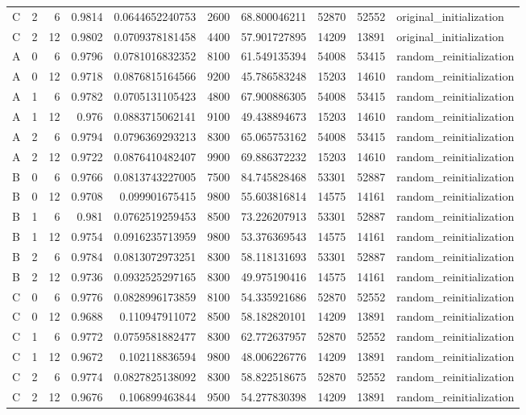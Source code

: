 \begin{tabular}{lrrrrrrrrl}
C & 2 & 6 & 0.9814 & 0.0644652240753 & 2600 & 68.800046211 & 52870 & 52552 & original\_initialization \\
C & 2 & 12 & 0.9802 & 0.0709378181458 & 4400 & 57.901727895 & 14209 & 13891 & original\_initialization \\
A & 0 & 6 & 0.9796 & 0.0781016832352 & 8100 & 61.549135394 & 54008 & 53415 & random\_reinitialization \\
A & 0 & 12 & 0.9718 & 0.0876815164566 & 9200 & 45.786583248 & 15203 & 14610 & random\_reinitialization \\
A & 1 & 6 & 0.9782 & 0.0705131105423 & 4800 & 67.900886305 & 54008 & 53415 & random\_reinitialization \\
A & 1 & 12 & 0.976 & 0.0883715062141 & 9100 & 49.438894673 & 15203 & 14610 & random\_reinitialization \\
A & 2 & 6 & 0.9794 & 0.0796369293213 & 8300 & 65.065753162 & 54008 & 53415 & random\_reinitialization \\
A & 2 & 12 & 0.9722 & 0.0876410482407 & 9900 & 69.886372232 & 15203 & 14610 & random\_reinitialization \\
B & 0 & 6 & 0.9766 & 0.0813743227005 & 7500 & 84.745828468 & 53301 & 52887 & random\_reinitialization \\
B & 0 & 12 & 0.9708 & 0.099901675415 & 9800 & 55.603816814 & 14575 & 14161 & random\_reinitialization \\
B & 1 & 6 & 0.981 & 0.0762519259453 & 8500 & 73.226207913 & 53301 & 52887 & random\_reinitialization \\
B & 1 & 12 & 0.9754 & 0.0916235713959 & 9800 & 53.376369543 & 14575 & 14161 & random\_reinitialization \\
B & 2 & 6 & 0.9784 & 0.0813072973251 & 8300 & 58.118131693 & 53301 & 52887 & random\_reinitialization \\
B & 2 & 12 & 0.9736 & 0.0932525297165 & 8300 & 49.975190416 & 14575 & 14161 & random\_reinitialization \\
C & 0 & 6 & 0.9776 & 0.0828996173859 & 8100 & 54.335921686 & 52870 & 52552 & random\_reinitialization \\
C & 0 & 12 & 0.9688 & 0.110947911072 & 8500 & 58.182820101 & 14209 & 13891 & random\_reinitialization \\
C & 1 & 6 & 0.9772 & 0.0759581882477 & 8300 & 62.772637957 & 52870 & 52552 & random\_reinitialization \\
C & 1 & 12 & 0.9672 & 0.102118836594 & 9800 & 48.006226776 & 14209 & 13891 & random\_reinitialization \\
C & 2 & 6 & 0.9774 & 0.0827825138092 & 8300 & 58.822518675 & 52870 & 52552 & random\_reinitialization \\
C & 2 & 12 & 0.9676 & 0.106899463844 & 9500 & 54.277830398 & 14209 & 13891 & random\_reinitialization \\
\bottomrule
\end{tabular}
